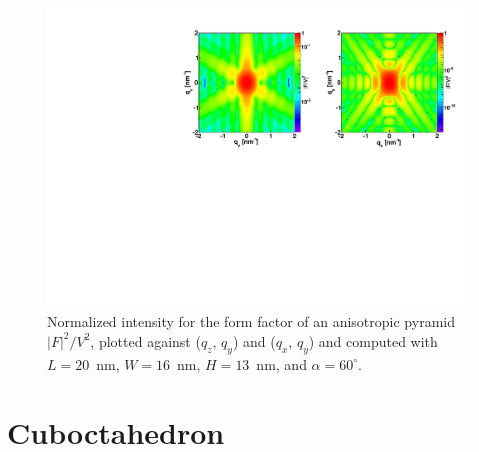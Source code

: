 \begin{figure}[h]
\begin{center}
\includegraphics[width=\textwidth]{Figures/figffanisopyramid}
\end{center}
\caption{Normalized intensity for the form factor of an anisotropic
  pyramid $|F|^2/V^2$, plotted against ($q_z$, $q_y$) and  ($q_x$, $q_y$) and computed with $L=20$~nm, $W=16$~nm, $H=13$~nm,
  and $\alpha=60^{\circ}$.}
\label{fig:FFAnisoPyramidEx}
\end{figure}

\FloatBarrier


\newpage{\cleardoublepage}
\section{Cuboctahedron}  

